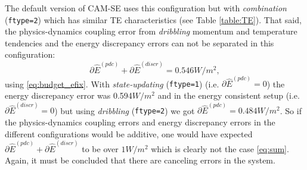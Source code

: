 \documentclass[draft,linenumbers]{agujournal}
\newcommand*{\gi}[1]{\widehat{#1}}
\begin{document}
The default version of CAM-SE uses this configuration but with {\em{combination}} ({\tt{ftype=2}}) which has similar TE characteristics (see Table \ref{table:TE}). That said, the physics-dynamics coupling error from {\em{dribbling}} momentum and temperature tendencies and the energy discrepancy errors can not be separated in this configuration:
\begin{equation}
\label{eq:sum}
\partial \gi{E}^{({pdc})}+\partial \gi{E}^{({discr})}=0.546W/m^2,
\end{equation}
using \eqref{eq:budget_efix}. With {\em{state-updating}} ({\tt{ftype=1}}) (i.e. $\partial \gi{E}^{({pdc})}=0$) the energy discrepancy error was 0.594$W/m^2$ and in the energy consistent setup (i.e. $\partial \gi{E}^{({discr})}=0$) but using {\em{dribbling}} ({\tt{ftype=2}}) we got $\partial \gi{E}^{({pdc})}=0.484W/m^2$. So if the physics-dynamics coupling errors and energy discrepancy errors in the different configurations would be additive, one would have expected $\partial \gi{E}^{({pdc})}+\partial \gi{E}^{({discr})}$ to be over $1W/m^2$ which is clearly not the case \eqref{eq:sum}. Again, it must be concluded that there are canceling errors in the system.
\end{document}

